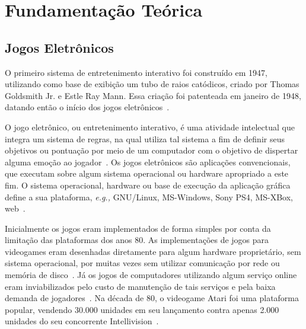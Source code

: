\chapter{Fundamentação Teórica}
\label{cap2}



\section{Jogos Eletrônicos}



O primeiro sistema de entretenimento interativo foi construído em 1947, utilizando como base de exibição um tubo de raios catódicos, criado por Thomas Goldsmith Jr. e Estle Ray Mann.
%
Essa criação foi patenteada em janeiro de 1948, datando então o início dos jogos eletrônicos~\cite{Adams2014Jan, patents1947Jan}.



O jogo eletrônico, ou entretenimento interativo, é uma atividade intelectual que integra um sistema de regras, na qual utiliza tal sistema a fim de definir seus objetivos ou pontuação por meio de um computador com o objetivo de dispertar alguma emoção ao jogador~\cite{video_game_technologies}.
%
Os jogos eletrônicos são aplicações convencionais, que executam sobre algum sistema operacional ou hardware apropriado a este fim.
%
O sistema operacional, hardware ou base de execução da aplicação gráfica define a sua plataforma, \textit{e.g.,} GNU/Linux, MS-Windows, Sony PS4, MS-XBox, web~\cite{adams_1208533}.



Inicialmente os jogos eram implementados de forma simples por conta da limitação das plataformas dos anos 80.
%
As implementações de jogos para videogames eram desenhadas diretamente para algum hardware proprietário, sem sistema operacional, por muitas vezes sem utilizar comunicação por rede ou memória de disco~\cite{rollings2003andrew}.
%
Já os jogos de computadores utilizando algum serviço online eram inviabilizados pelo custo de manutenção de tais serviços e pela baixa demanda de jogadores~\cite{adams_1208533}.
%
Na década de 80, o videogame Atari foi uma plataforma popular, vendendo 30.000 unidades em seu lançamento contra apenas 2.000 unidades do seu concorrente Intellivision~\cite{atari_age}.



